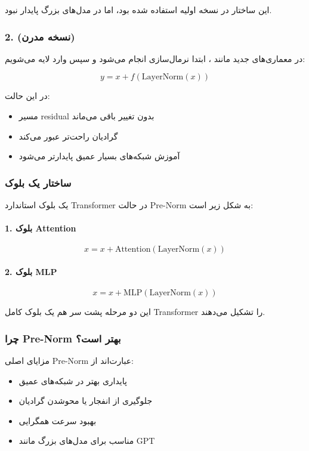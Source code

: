 \documentclass{article}
\begin{document}
این ساختار در نسخه اولیه  استفاده شده بود، اما در مدل‌های بزرگ پایدار نبود.

\subsubsection*{2.  (نسخه مدرن)}

در معماری‌های جدید مانند ، ابتدا نرمال‌سازی انجام می‌شود و سپس وارد لایه می‌شویم:

\[
y = x + f(\text{LayerNorm}(x))
\]

در این حالت:

\begin{itemize}
	\item مسیر residual بدون تغییر باقی می‌ماند
	\item گرادیان راحت‌تر عبور می‌کند
	\item آموزش شبکه‌های بسیار عمیق پایدارتر می‌شود
\end{itemize}

\subsubsection*{ساختار یک بلوک }

یک بلوک استاندارد Transformer در حالت Pre-Norm به شکل زیر است:

\paragraph{1. بلوک Attention}

\[
x = x + \text{Attention}(\text{LayerNorm}(x))
\]

\paragraph{2. بلوک MLP}

\[
x = x + \text{MLP}(\text{LayerNorm}(x))
\]

این دو مرحله پشت سر هم یک بلوک کامل Transformer را تشکیل می‌دهند.

\subsubsection*{چرا Pre-Norm بهتر است؟}

مزایای اصلی Pre-Norm عبارت‌اند از:

\begin{itemize}
	\item پایداری بهتر در شبکه‌های عمیق
	\item جلوگیری از انفجار یا محوشدن گرادیان
	\item بهبود سرعت همگرایی
	\item مناسب برای مدل‌های بزرگ مانند GPT
\end{itemize}
\end{document}
